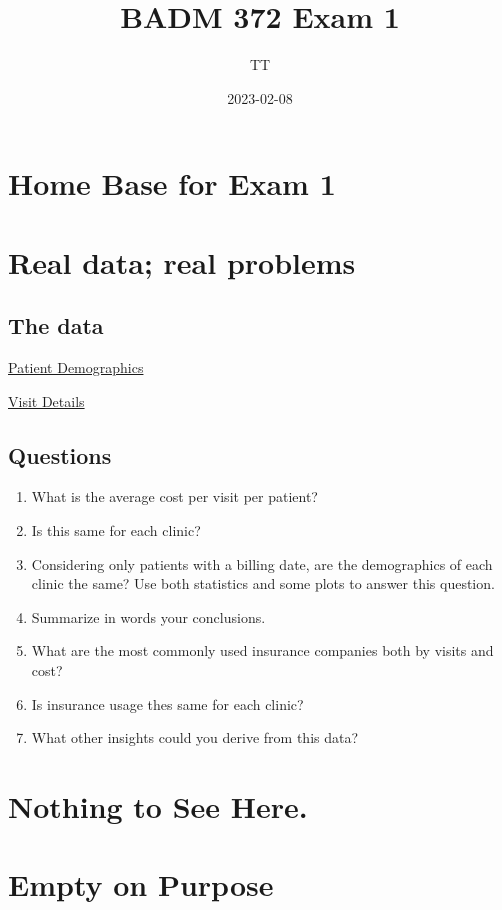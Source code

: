 \documentclass[
]{book}
\title{BADM 372 Exam 1}
\author{TT}
\date{2023-02-08}
\providecommand{\tightlist}{%
  \setlength{\itemsep}{0pt}\setlength{\parskip}{0pt}}
\begin{document}
\maketitle

{
\setcounter{tocdepth}{1}
\tableofcontents
}
\hypertarget{home-base-for-exam-1}{%
\chapter{Home Base for Exam 1}\label{home-base-for-exam-1}}

\hypertarget{real-data-real-problems}{%
\chapter{Real data; real problems}\label{real-data-real-problems}}

\hypertarget{the-data}{%
\section{The data}\label{the-data}}

\href{https://drive.google.com/file/d/1xdZJrkzG_FNxVUFwrGm6b1HGtUWA510w/view?usp=sharing}{Patient Demographics}

\href{https://drive.google.com/file/d/1ighQbbB3okKcJBBPuOTKKPFoQFYaX255/view?usp=sharing}{Visit Details}

\hypertarget{questions}{%
\section{Questions}\label{questions}}

\begin{enumerate}
\def\labelenumi{\arabic{enumi}.}
\tightlist
\item
  What is the average cost per visit per patient?\\
\item
  Is this same for each clinic?
\item
  Considering only patients with a billing date, are the demographics of each clinic the same? Use both statistics and some plots to answer this question.\\
\item
  Summarize in words your conclusions.
\item
  What are the most commonly used insurance companies both by visits and cost?
\item
  Is insurance usage thes same for each clinic?
\item
  What other insights could you derive from this data?
\end{enumerate}

\hypertarget{nothing-to-see-here.}{%
\chapter{Nothing to See Here.}\label{nothing-to-see-here.}}

\hypertarget{empty-on-purpose}{%
\chapter{Empty on Purpose}\label{empty-on-purpose}}

  
\end{document}
